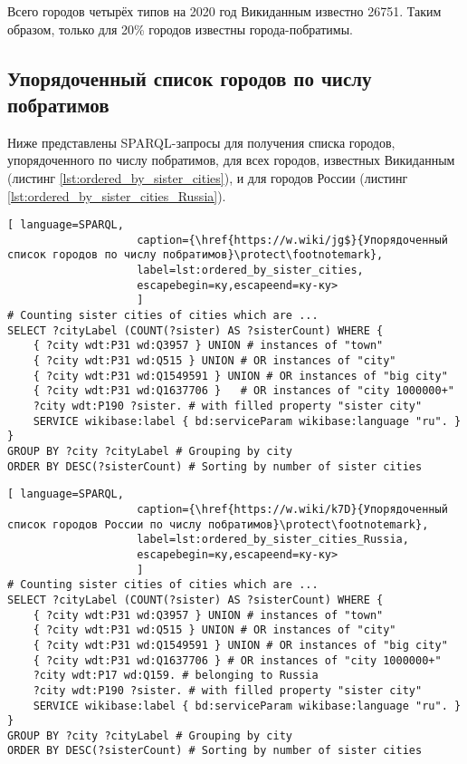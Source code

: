 Всего городов четырёх типов на 2020 год Викиданным известно \num{26751}. Таким образом, только для 20\% городов известны города-побратимы.

\subsection{Упорядоченный список городов по числу побратимов}

Ниже представлены SPARQL-запросы для получения списка городов, упорядоченного по числу побратимов, для всех городов, известных Викиданным (листинг \ref{lst:ordered_by_sister_cities}), и для городов России (листинг \ref{lst:ordered_by_sister_cities_Russia}).

\begin{lstlisting}[ language=SPARQL, 
                    caption={\href{https://w.wiki/jg$}{Упорядоченный список городов по числу побратимов}\protect\footnotemark},
                    label=lst:ordered_by_sister_cities, 
                    escapebegin=ку,escapeend=ку-ку>
                    ]
# Counting sister cities of cities which are ...
SELECT ?cityLabel (COUNT(?sister) AS ?sisterCount) WHERE {           
	{ ?city wdt:P31 wd:Q3957 } UNION # instances of "town"
	{ ?city wdt:P31 wd:Q515 } UNION # OR instances of "city"
	{ ?city wdt:P31 wd:Q1549591 } UNION # OR instances of "big city"
	{ ?city wdt:P31 wd:Q1637706 }	# OR instances of "city 1000000+"
	?city wdt:P190 ?sister. # with filled property "sister city"
	SERVICE wikibase:label { bd:serviceParam wikibase:language "ru". }
}
GROUP BY ?city ?cityLabel # Grouping by city                                   
ORDER BY DESC(?sisterCount) # Sorting by number of sister cities
\end{lstlisting}

\begin{lstlisting}[ language=SPARQL, 
                    caption={\href{https://w.wiki/k7D}{Упорядоченный список городов России по числу побратимов}\protect\footnotemark},
                    label=lst:ordered_by_sister_cities_Russia, 
                    escapebegin=ку,escapeend=ку-ку>
                    ]
# Counting sister cities of cities which are ...
SELECT ?cityLabel (COUNT(?sister) AS ?sisterCount) WHERE {           
	{ ?city wdt:P31 wd:Q3957 } UNION # instances of "town"
	{ ?city wdt:P31 wd:Q515 } UNION # OR instances of "city"
	{ ?city wdt:P31 wd:Q1549591 } UNION # OR instances of "big city"
	{ ?city wdt:P31 wd:Q1637706 } # OR instances of "city 1000000+"      
	?city wdt:P17 wd:Q159. # belonging to Russia
	?city wdt:P190 ?sister. # with filled property "sister city"
	SERVICE wikibase:label { bd:serviceParam wikibase:language "ru". }
}
GROUP BY ?city ?cityLabel # Grouping by city
ORDER BY DESC(?sisterCount) # Sorting by number of sister cities
\end{lstlisting}

